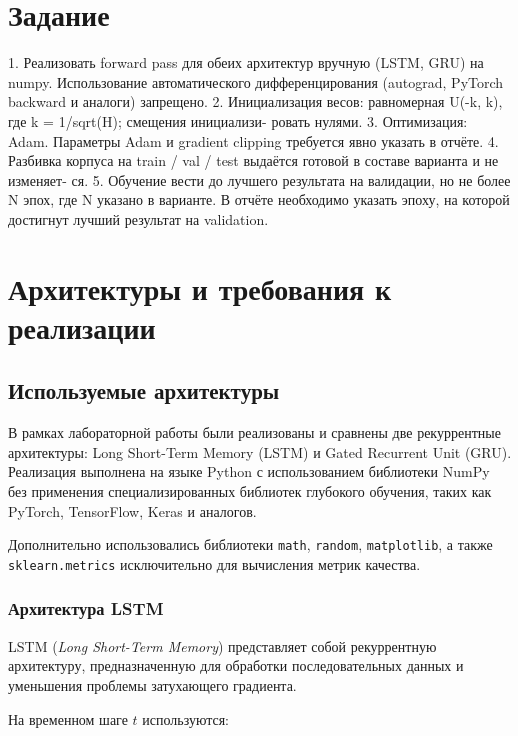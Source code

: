 \thispagestyle{empty}

\newpage
\tableofcontents
\newpage

\section{Задание}

1. Реализовать forward pass  для обеих архитектур вручную (LSTM, GRU) на numpy.
Использование автоматического дифференцирования (autograd, PyTorch backward и аналоги)
запрещено.
2. Инициализация весов: равномерная U(-k, k), где k = 1/sqrt(H); смещения инициализи-
ровать нулями.
3. Оптимизация: Adam. Параметры Adam и gradient clipping требуется явно указать в
отчёте.
4. Разбивка корпуса на train / val / test выдаётся готовой в составе варианта и не изменяет-
ся.
5. Обучение вести до лучшего результата на валидации, но не более N эпох, где N указано
в варианте. В отчёте необходимо указать эпоху, на которой достигнут лучший результат
на validation.

\section{Архитектуры и требования к реализации}

\subsection{Используемые архитектуры}

В рамках лабораторной работы были реализованы и сравнены две рекуррентные
архитектуры: Long Short-Term Memory (LSTM) и Gated Recurrent Unit (GRU).
Реализация выполнена на языке Python с использованием библиотеки NumPy без
применения специализированных библиотек глубокого обучения, таких как PyTorch,
TensorFlow, Keras и аналогов.

Дополнительно использовались библиотеки \texttt{math}, \texttt{random},
\texttt{matplotlib}, а также \texttt{sklearn.metrics} исключительно для
вычисления метрик качества.

\subsubsection{Архитектура LSTM}

LSTM (\textit{Long Short-Term Memory}) представляет собой рекуррентную архитектуру, предназначенную для обработки последовательных данных и уменьшения проблемы затухающего градиента.

На временном шаге $t$ используются:


